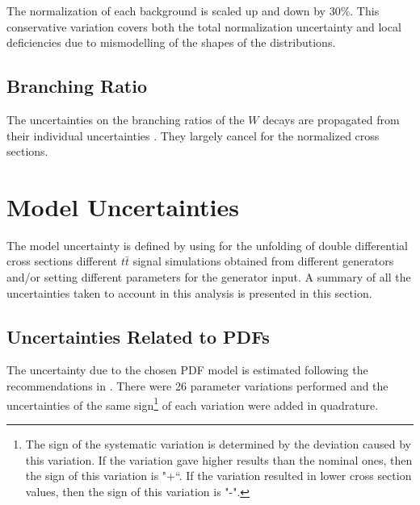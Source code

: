 The normalization of each background is scaled up and down by 30$\%$\cite{Asin2014Auth}. This conservative variation covers both the 
total normalization uncertainty and local deficiencies due to mismodelling of the shapes of the distributions. 

\subsection{Branching Ratio}

The uncertainties on the branching ratios of the $W$ decays are propagated from their individual uncertainties \cite{PDG-2012}.
They largely cancel for the normalized cross sections.
\section{Model Uncertainties}

The model uncertainty is defined by using for the unfolding of double differential cross sections different $t\bar{t}$ signal simulations 
obtained from different generators and/or setting
different parameters for the generator input. A summary of all the uncertainties taken to account in this analysis is presented 
in this section.

\subsection{Uncertainties Related to PDFs}

The uncertainty due to the chosen PDF model is estimated following the recommendations in \cite{Lai:2010vv}. There were 26 parameter variations
performed and the uncertainties of the same sign\footnote{The sign of the systematic variation is determined by the deviation caused by this
variation. If the variation gave higher results than the nominal ones, then the sign of this variation is "+``. If the variation resulted
in lower cross section values, then the sign of this variation is "-".} of each variation were added in quadrature.

% 

